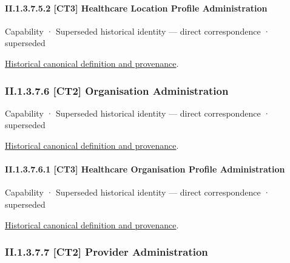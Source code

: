 \paragraph*{II.1.3.7.5.2 [CT3] Healthcare Location Profile Administration}
\label{navigation:II.1.3.7.5.2}

\label{element:8a04d1f16d0849e786d2aaec33e0ba87}
{\small Capability · Superseded historical identity — direct correspondence · superseded}\par
\href{../../../../continuum/strategy/capability/8a04d1f16d0849e786d2aaec33e0ba87.md}{Historical canonical definition and provenance}.\par
\subsubsection*{II.1.3.7.6 [CT2] Organisation Administration}
\label{navigation:II.1.3.7.6}

\label{element:1b0eacfbb27d4631a24f9279dab6681d}
{\small Capability · Superseded historical identity — direct correspondence · superseded}\par
\href{../../../../continuum/strategy/capability/1b0eacfbb27d4631a24f9279dab6681d.md}{Historical canonical definition and provenance}.\par
\paragraph*{II.1.3.7.6.1 [CT3] Healthcare Organisation Profile Administration}
\label{navigation:II.1.3.7.6.1}

\label{element:e485424b799c42aca7399d341ca02d0b}
{\small Capability · Superseded historical identity — direct correspondence · superseded}\par
\href{../../../../continuum/strategy/capability/e485424b799c42aca7399d341ca02d0b.md}{Historical canonical definition and provenance}.\par
\subsubsection*{II.1.3.7.7 [CT2] Provider Administration}
\label{navigation:II.1.3.7.7}

